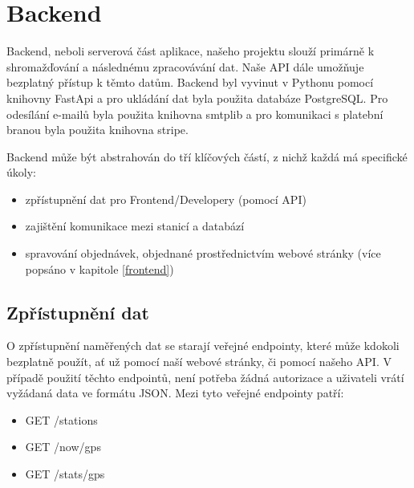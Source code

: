 \section{Backend}
Backend, neboli serverová část aplikace, našeho projektu slouží primárně k shromažďování a následnému zpracovávání dat. Naše API dále umožňuje bezplatný přístup k těmto datům.
Backend byl vyvinut v Pythonu pomocí knihovny FastApi a pro ukládání dat byla použita databáze PostgreSQL.
Pro odesílání e-mailů byla použita knihovna smtplib a pro komunikaci s platební branou byla použita knihovna stripe. 

Backend může být abstrahován do tří klíčových částí, z nichž každá má specifické úkoly: 
\begin{itemize}
  \item zpřístupnění dat pro Frontend/Developery (pomocí API) 
  \item zajištění komunikace mezi stanicí a databází 
  \item spravování objednávek, objednané prostřednictvím webové stránky (více popsáno v kapitole \ref{frontend})  
\end{itemize}

\subsection{Zpřístupnění dat}
O zpřístupnění naměřených dat se starají veřejné endpointy, které může kdokoli bezplatně použít, ať už pomocí naší webové stránky, či pomocí našeho API. 
V případě použití těchto endpointů, není potřeba žádná autorizace a uživateli vrátí vyžádaná data ve formátu JSON. Mezi tyto veřejné endpointy patří:
\begin{itemize}
  \item GET /stations
  \item GET /now/{gps} 
  \item GET /stats/{gps}
\end{itemize}

